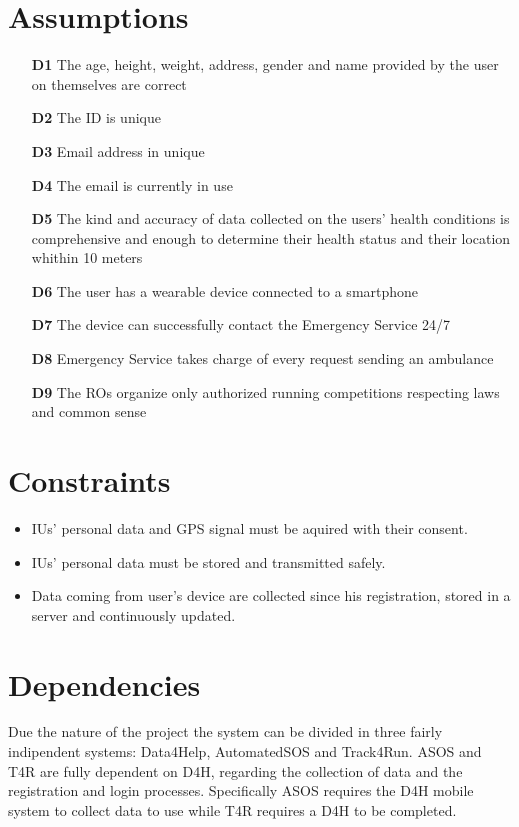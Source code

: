 \section{Assumptions}
\begin{itemize}
\item	[\textbf{D1}] The age, height, weight, address, gender and name provided by the user on themselves are correct
\item	[\textbf{D2}] The ID is unique
\item	[\textbf{D3}] Email address in unique
\item	[\textbf{D4}] The email is currently in use
\item	[\textbf{D5}] The kind and accuracy of data collected on the users’ health conditions is comprehensive and enough to determine their health status and their location whithin 10 meters
\item	[\textbf{D6}] The user has a wearable device connected to a smartphone
\item	[\textbf{D7}] The device can successfully contact the Emergency Service 24/7
\item	[\textbf{D8}] Emergency Service takes charge of every request sending an ambulance
\item	[\textbf{D9}] The ROs organize only authorized running competitions respecting laws and common sense
\end{itemize}

\section{Constraints}
\begin{itemize}
\item IUs' personal data and GPS signal must be aquired with their consent.
\item IUs' personal data must be stored and transmitted safely. 
\item Data coming from user’s device are collected since his registration, stored in a server and continuously updated.
\end{itemize}
\section{Dependencies}
Due the nature of the project the system can be divided in three fairly indipendent systems: Data4Help, AutomatedSOS and Track4Run. ASOS and T4R are fully dependent on D4H, regarding the collection of data and the registration and login processes. Specifically ASOS requires the D4H mobile system to collect data to use while
T4R requires a D4H to be completed.
